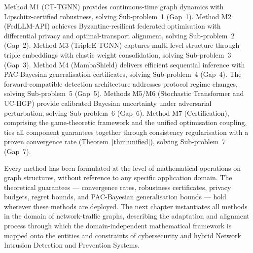 Method M1 (CT-TGNN) provides continuous-time graph dynamics with Lipschitz-certified robustness, solving Sub-problem~1 (Gap~1). Method M2 (FedLLM-API) achieves Byzantine-resilient federated optimisation with differential privacy and optimal-transport alignment, solving Sub-problem~2 (Gap~2). Method M3 (TripleE-TGNN) captures multi-level structure through triple embeddings with elastic weight consolidation, solving Sub-problem~3 (Gap~3). Method M4 (MambaShield) delivers efficient sequential inference with PAC-Bayesian generalisation certificates, solving Sub-problem~4 (Gap~4). The forward-compatible detection architecture addresses protocol regime changes, solving Sub-problem~5 (Gap~5). Methods M5/M6 (Stochastic Transformer and UC-HGP) provide calibrated Bayesian uncertainty under adversarial perturbation, solving Sub-problem~6 (Gap~6). Method M7 (Certification), comprising the game-theoretic framework and the unified optimisation coupling, ties all component guarantees together through consistency regularisation with a proven convergence rate (Theorem~\ref{thm:unified}), solving Sub-problem~7 (Gap~7).

Every method has been formulated at the level of mathematical operations on graph structures, without reference to any specific application domain. The theoretical guarantees --- convergence rates, robustness certificates, privacy budgets, regret bounds, and PAC-Bayesian generalisation bounds --- hold wherever these methods are deployed. The next chapter instantiates all methods in the domain of network-traffic graphs, describing the adaptation and alignment process through which the domain-independent mathematical framework is mapped onto the entities and constraints of cybersecurity and hybrid Network Intrusion Detection and Prevention Systems.

